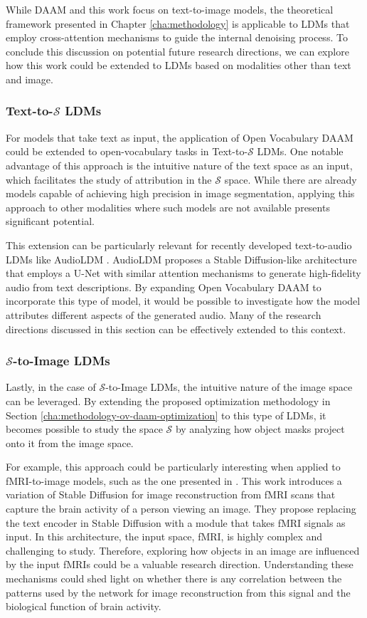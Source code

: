 While DAAM \cite{DAAM} and this work focus on text-to-image models, the theoretical framework presented in Chapter \ref{cha:methodology} is applicable to LDMs that employ cross-attention mechanisms to guide the internal denoising process. To conclude this discussion on potential future research directions, we can explore how this work could be extended to LDMs based on modalities other than text and image.

\subsubsection{Text-to-$\mathcal{S}$ LDMs}

For models that take text as input, the application of Open Vocabulary DAAM could be extended to open-vocabulary tasks in Text-to-$\mathcal{S}$ LDMs. One notable advantage of this approach is the intuitive nature of the text space as an input, which facilitates the study of attribution in the $\mathcal{S}$ space. While there are already models capable of achieving high precision in image segmentation, applying this approach to other modalities where such models are not available presents significant potential.

This extension can be particularly relevant for recently developed text-to-audio LDMs like AudioLDM \cite{liu2023audioldm}. AudioLDM proposes a Stable Diffusion-like architecture that employs a U-Net with similar attention mechanisms to generate high-fidelity audio from text descriptions. By expanding Open Vocabulary DAAM to incorporate this type of model, it would be possible to investigate how the model attributes different aspects of the generated audio. Many of the research directions discussed in this section can be effectively extended to this context.


\subsubsection{$\mathcal{S}$-to-Image LDMs}

Lastly, in the case of $\mathcal{S}$-to-Image LDMs, the intuitive nature of the image space can be leveraged. By extending the proposed optimization methodology in Section \ref{cha:methodology-ov-daam-optimization} to this type of LDMs, it becomes possible to study the space $\mathcal{S}$ by analyzing how object masks project onto it from the image space.

For example, this approach could be particularly interesting when applied to fMRI-to-image models, such as the one presented in \cite{Takagi2023HighresolutionIR}. This work introduces a variation of Stable Diffusion for image reconstruction from fMRI scans that capture the brain activity of a person viewing an image. They propose replacing the text encoder in Stable Diffusion \cite{rombach2022high, Radford2021LearningTV} with a module that takes fMRI signals as input. In this architecture, the input space, fMRI, is highly complex and challenging to study. Therefore, exploring how objects in an image are influenced by the input fMRIs could be a valuable research direction. Understanding these mechanisms could shed light on whether there is any correlation between the patterns used by the network for image reconstruction from this signal and the biological function of brain activity.